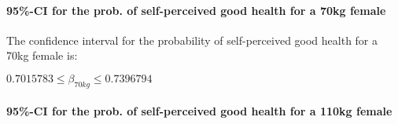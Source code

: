 \documentclass[]{article}
\newenvironment{Shaded}{\begin{snugshade}}{\end{snugshade}}
\newcommand{\CommentTok}[1]{\textcolor[rgb]{0.56,0.35,0.01}{\textit{#1}}}
\newcommand{\DataTypeTok}[1]{\textcolor[rgb]{0.13,0.29,0.53}{#1}}
\newcommand{\DecValTok}[1]{\textcolor[rgb]{0.00,0.00,0.81}{#1}}
\newcommand{\FloatTok}[1]{\textcolor[rgb]{0.00,0.00,0.81}{#1}}
\newcommand{\KeywordTok}[1]{\textcolor[rgb]{0.13,0.29,0.53}{\textbf{#1}}}
\newcommand{\NormalTok}[1]{#1}
\newcommand{\OperatorTok}[1]{\textcolor[rgb]{0.81,0.36,0.00}{\textbf{#1}}}
\newcommand{\OtherTok}[1]{\textcolor[rgb]{0.56,0.35,0.01}{#1}}
\newcommand{\StringTok}[1]{\textcolor[rgb]{0.31,0.60,0.02}{#1}}
\let\oldparagraph\paragraph
\renewcommand{\paragraph}[1]{\oldparagraph{#1}\mbox{}}
\begin{document}
\hypertarget{ci-for-the-prob.-of-self-perceived-good-health-for-a-70kg-female}{%
\paragraph{95\%-CI for the prob. of self-perceived good health for a
70kg
female}\label{ci-for-the-prob.-of-self-perceived-good-health-for-a-70kg-female}}

\begin{Shaded}
\end{Shaded}

The confidence interval for the probability of self-perceived good
health for a 70kg female is:

\(0.7015783 \leq \beta_{70kg} \leq 0.7396794\)

\newpage

\hypertarget{ci-for-the-prob.-of-self-perceived-good-health-for-a-110kg-female}{%
\paragraph{95\%-CI for the prob. of self-perceived good health for a
110kg
female}\label{ci-for-the-prob.-of-self-perceived-good-health-for-a-110kg-female}}
\end{document}
